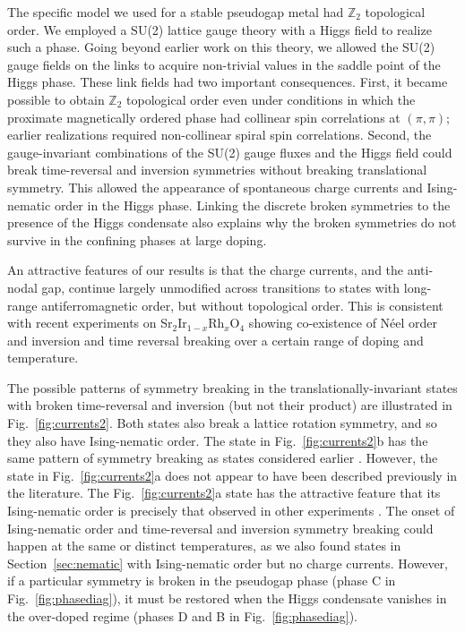 \documentclass[aps,prb,preprint,onecolumn,citeautoscript,superscriptaddress,footinbib,
eqsecnum]{revtex4-1}
\begin{document}
The specific model we used for a stable pseudogap metal
had $\mathbb{Z}_2$ topological order. We employed a SU(2) lattice gauge theory with a Higgs field to realize such a phase. Going beyond earlier work on this theory, we
allowed the SU(2) gauge fields on the links to acquire
non-trivial values in the saddle point of the Higgs phase. These link fields had two important consequences. 
First, it became possible to obtain $\mathbb{Z}_2$
topological order even under conditions in which the proximate magnetically
ordered phase had collinear spin correlations at $(\pi, \pi)$; earlier 
realizations \cite{NRSS91,SSNR91,SS09,DCSS15b,DCSS16} required non-collinear spiral spin correlations. Second, the gauge-invariant combinations of the SU(2) gauge fluxes and the Higgs field could
break time-reversal and inversion symmetries without breaking translational symmetry. This allowed the appearance of 
spontaneous charge currents and Ising-nematic order in the Higgs phase. Linking the discrete broken symmetries to the presence of the Higgs condensate also explains why the broken symmetries do not survive in the confining phases at large doping.

An attractive features of our results is that
the charge currents, and the anti-nodal gap,
continue largely unmodified across transitions to states with long-range antiferromagnetic order, but without topological order. This is consistent with recent experiments \cite{2016NatPh..12...32Z,2017arXiv170106485J} on Sr$_2$Ir$_{1-x}$Rh$_x$O$_4$ showing
co-existence of N\'eel order and inversion and time reversal breaking over a certain range of doping and temperature.

The possible patterns of symmetry breaking in the translationally-invariant states with broken time-reversal and inversion
(but not their product) are illustrated in Fig.~\ref{fig:currents2}. Both states also break a lattice
rotation symmetry, and so they also have Ising-nematic order. The state in Fig.~\ref{fig:currents2}b
has the same pattern of symmetry breaking as states considered earlier \cite{2002PhRvL..89x7003S,2004PhRvB..69x5104S,2008PhRvL.100b7003B}. However, the state in Fig.~\ref{fig:currents2}a does not
appear to have been described previously in the literature. The Fig.~\ref{fig:currents2}a state has the attractive feature that its
Ising-nematic order is precisely that observed in other experiments \cite{2002PhRvL..88m7005A,Hinkov597,2010Natur.463..519D,2010Natur.466..347L}. 
The onset of Ising-nematic order and time-reversal and inversion symmetry breaking
could happen at the same or distinct temperatures, as we also found states in Section~\ref{sec:nematic} with Ising-nematic order but no charge currents. However, if a particular symmetry is broken in the pseudogap phase
(phase C in Fig.~\ref{fig:phasediag}), it must be restored when the Higgs condensate vanishes in the over-doped regime (phases D and B in Fig.~\ref{fig:phasediag}).
\end{document}
